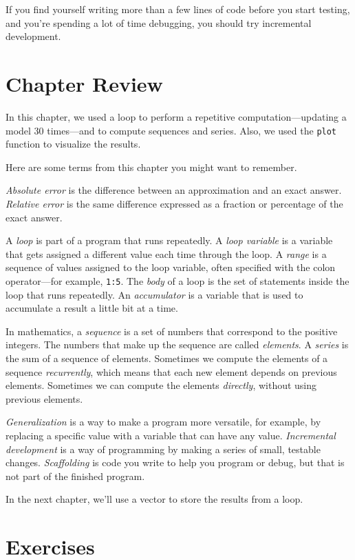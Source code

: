 \documentclass[../../book.tex]{subfiles}
\begin{document}
If you find yourself writing more than a few lines of code before
you start testing, and you're spending a lot of time debugging,
you should try incremental development.




\section{Chapter Review}

In this chapter, we used a loop to perform a repetitive computation---updating a model 30 times---and to compute sequences and series.  Also,  we used the \lstinline{plot} function to visualize the results.

Here are some terms from this chapter you might want to remember.

\emph{Absolute error} is the difference between an approximation and
an exact answer. \emph{Relative error} is the same difference expressed as a fraction or percentage of the exact answer.

A \emph{loop} is part of a program that runs repeatedly.
A \emph{loop variable} is a variable that gets assigned a different value each time through the loop.
A \emph{range} is a sequence of values assigned to the loop variable, often
specified with the colon operator---for example, \lstinline{1:5}.
The \emph{body} of a loop is the set of statements inside the loop that runs repeatedly.
An \emph{accumulator} is a variable that is used to accumulate a result a little bit at a time.

In mathematics, a \emph{sequence} is a set of numbers that correspond
to the positive integers.
The numbers that make up the sequence are called \mbox{\emph{elements}}.
A \emph{series} is the sum of a sequence of elements.
Sometimes we compute the elements of a sequence \emph{recurrently}, which means that each new element depends on previous elements.  Sometimes we can compute the elements \emph{directly}, without using previous elements.

\emph{Generalization} is a way to make a program more versatile, for example, by replacing a specific value with a variable that can have any value.
\emph{Incremental development} is a way of programming by making a series of small, testable changes.
\emph{Scaffolding} is code you write to help you program or debug, but
that is not part of the finished program.

In the next chapter, we'll use a vector to store the results from a loop.


\section{Exercises}
\end{document}
